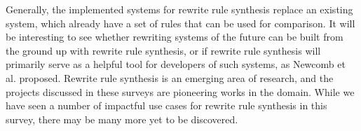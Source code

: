 \documentclass[acmsmall,screen,nonacm]{acmart}
\begin{document}
Generally, the implemented systems for rewrite rule synthesis replace an existing system, which already have a set of rules that can be used for comparison. It will be interesting to see whether rewriting systems of the future can be built from the ground up with rewrite rule synthesis, or if rewrite rule synthesis will primarily serve as a helpful tool for developers of such systems, as Newcomb et al. proposed. Rewrite rule synthesis is an emerging area of research, and the projects discussed in these surveys are pioneering works in the domain. While we have seen a number of impactful use cases for rewrite rule synthesis in this survey, there may be many more yet to be discovered.



\end{document}

